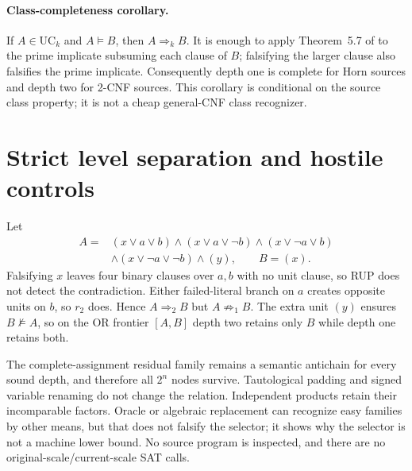 \documentclass[11pt]{article}
\begin{document}
\paragraph{Class-completeness corollary.}
If $A\in\mathrm{UC}_k$ and $A\models B$, then $A\Rightarrow_kB$.  It is
enough to apply Theorem~5.7 of \cite{gwynne2014nested} to the prime implicate
subsuming each clause of $B$; falsifying the larger clause also falsifies the
prime implicate.  Consequently depth one is complete for Horn sources and
depth two for 2-CNF sources.  This corollary is conditional on the source
class property; it is not a cheap general-CNF class recognizer.

\section*{Strict level separation and hostile controls}
Let
\begin{align*}
A={}&(x\vee a\vee b)\wedge(x\vee a\vee\neg b)
\wedge(x\vee\neg a\vee b)\\
&\wedge(x\vee\neg a\vee\neg b)\wedge(y),
\qquad B=(x).
\end{align*}
Falsifying $x$ leaves four binary clauses over $a,b$ with no unit clause, so
RUP does not detect the contradiction.  Either failed-literal branch on $a$
creates opposite units on $b$, so $r_2$ does.  Hence $A\Rightarrow_2B$ but
$A\not\Rightarrow_1B$.  The extra unit $(y)$ ensures $B\not\models A$, so on
the OR frontier $[A,B]$ depth two retains only $B$ while depth one retains
both.

The complete-assignment residual family remains a semantic antichain for
every sound depth, and therefore all $2^n$ nodes survive.  Tautological
padding and signed variable renaming do not change the relation.  Independent
products retain their incomparable factors.  Oracle or algebraic replacement
can recognize easy families by other means, but that does not falsify the
selector; it shows why the selector is not a machine lower bound.  No source
program is inspected, and there are no original-scale/current-scale SAT
calls.
\end{document}
